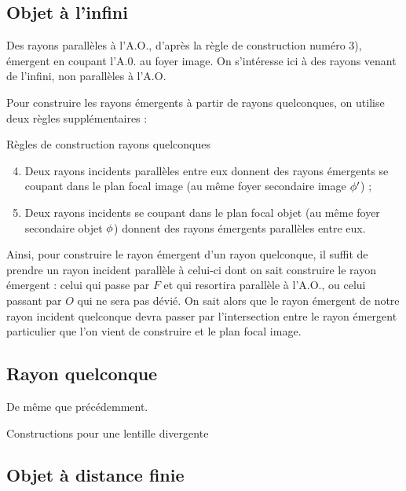 \documentclass[10pt,a5paper,notitlepage]{book}
\begin{document}
\subsection{Objet à l'infini}
Des rayons parallèles à l'A.O., d'après la règle de construction
numéro \textcolor{brandeisblue}{3)}, émergent en coupant l'A.0. au foyer image.
On s'intéresse ici à des rayons venant de l'infini, non parallèles à l'A.O.
\bigbreak

Pour construire les rayons émergents à partir de rayons quelconques, on utilise
deux règles supplémentaires :

\begin{defi}[label = rconstp]{Règles de construction rayons quelconques}
    \begin{enumerate}
        \setcounter{enumi}{3}
        \item Deux rayons incidents parallèles entre eux donnent des rayons
            émergents se coupant dans le plan focal image (au même foyer
            secondaire image $\phi'$) ;
        \item Deux rayons incidents se coupant dans le plan focal objet (au même
            foyer secondaire objet $\phi$) donnent des rayons émergents
            parallèles entre eux.
    \end{enumerate}
\end{defi}

Ainsi, pour construire le rayon émergent d'un rayon quelconque, il suffit de
prendre un rayon incident parallèle à celui-ci dont on sait construire le rayon
émergent : celui qui passe par $F$ et qui resortira parallèle à l'A.O., ou celui
passant par $O$ qui ne sera pas dévié. On sait alors que le rayon émergent de
notre rayon incident quelconque devra passer par l'intersection entre le rayon
émergent particulier que l'on vient de construire et le plan focal image.

\subsection{Rayon quelconque}
De même que précédemment.

\begin{center}
    \huge Constructions pour une lentille divergente
\end{center}

\setcounter{subsection}{0}
\subsection{Objet à distance finie}
\end{document}
